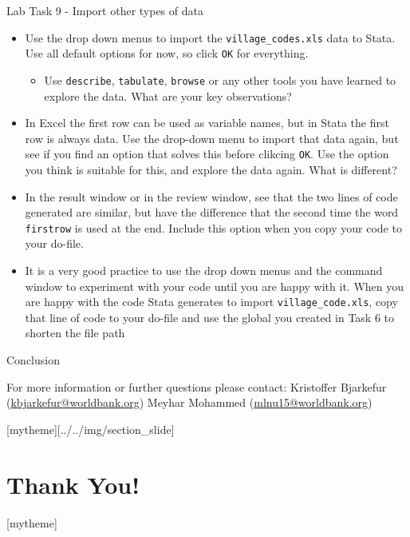 \documentclass[aspectratio=169]{beamer}
\newcommand{\sectionpic}[2]{
	\setbeamertemplate{section page}[mytheme][#2]
	\section{#1}
	\setbeamertemplate{section page}[mytheme]
}
\begin{document}
\begin{frame}{Lab Task 9 - Import other types of data}
	\begin{itemize}
		\item \small Use the drop down menus to import the \texttt{village\_codes.xls} data to Stata. Use all default options for now, so click \texttt{OK} for everything.
		\begin{itemize}
			\item \small Use \texttt{describe}, \texttt{tabulate}, \texttt{browse} or any other tools you have learned to explore the data. What are your key observations?
		\end{itemize}
		\item \small In Excel the first row can be used as variable names, but in Stata the first row is always data. Use the drop-down menu to import that data again, but see if you find an option that solves this before clikcing \texttt{OK}. Use the option you think is suitable for this, and explore the data again. What is different?
		\item \small In the result window or in the review window, see that the two lines of code generated are similar, but have the difference that the second time the word \texttt{firstrow} is used at the end. Include this option when you copy your code to your do-file.
		\item \small It is a very good practice to use the drop down menus and the command window to experiment with your code until you are happy with it. When you are happy with the code Stata generates to import \texttt{village\_code.xls}, copy that line of code to your do-file and use the global you created in Task 6 to shorten the file path
	\end{itemize}
\end{frame}

\begin{frame}{Conclusion}


\vspace{20mm}
For more information or further questions please contact:
\newline Kristoffer Bjarkefur (\url{kbjarkefur@worldbank.org}) \newline Meyhar Mohammed (\url{mlnu15@worldbank.org})

\end{frame}

\sectionpic{Thank You!}{../../img/section_slide}
\end{document}
